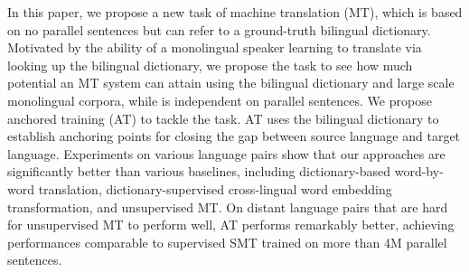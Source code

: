 In this paper, we propose a new task of machine translation (MT), which is based on no parallel sentences but can refer to a ground-truth bilingual dictionary. Motivated by the ability of a monolingual speaker learning to translate via looking up the bilingual dictionary, we propose the task to see how much potential an MT system can attain using the bilingual dictionary and large scale monolingual corpora, while is independent on parallel sentences. We propose anchored training (AT) to tackle the task. AT uses the bilingual dictionary to establish anchoring points for closing the gap between source language and target language. Experiments on various language pairs show that our approaches are significantly better than various baselines, including dictionary-based word-by-word translation, dictionary-supervised cross-lingual word embedding transformation, and unsupervised MT. On distant language pairs that are hard for unsupervised MT to perform well, AT performs remarkably better, achieving performances comparable to supervised SMT trained on more than 4M parallel sentences.

